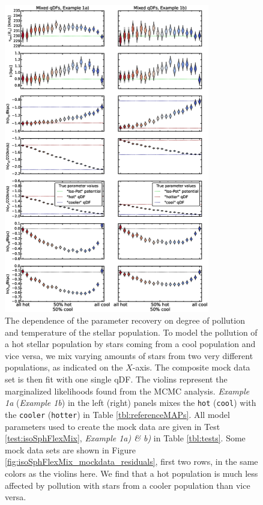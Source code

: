 \begin{figure}
\centering
\includegraphics[width=0.8\textwidth]{figs/isoSphFlexMixCont_violins.eps}
\caption{The dependence of the parameter recovery on degree of pollution and temperature of the stellar population. To model the pollution of a hot stellar population by stars coming from a cool population and vice versa, we mix varying amounts of stars from two very different populations, as indicated on the $X$-axis. The composite mock data set is then fit with one single qDF. The violins represent the marginalized likelihoods found from the MCMC analysis. \emph{Example 1a} (\emph{Example 1b}) in the left (right) panels mixes the \texttt{hot} (\texttt{cool}) \MAP{} with the \texttt{cooler} (\texttt{hotter}) \MAP{} in Table \ref{tbl:referenceMAPs}. All model parameters used to create the mock data are given in Test \ref{test:isoSphFlexMix}, \emph{Example 1a) \& b)} in Table \ref{tbl:tests}. Some mock data sets are shown in Figure \ref{fig:isoSphFlexMix_mockdata_residuals}, first two rows, in the same colors as the violins here.  We find that a hot population is much less affected by pollution with stars from a cooler population than vice versa. }
\label{fig:isoSphFlexMixCont}
\end{figure}



